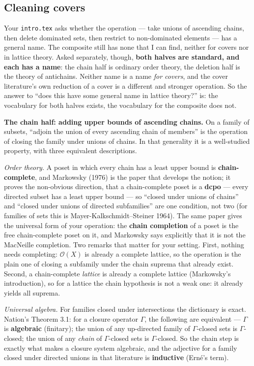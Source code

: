\documentclass[
]{article}
\newcounter{none} %
\begin{document}
\subsection{Cleaning covers}\label{cleaning-covers}

Your \texttt{intro.tex} asks whether the operation --- take unions of
ascending chains, then delete dominated sets, then restrict to
non-dominated elements --- has a general name. The composite still has
none that I can find, neither for covers nor in lattice theory. Asked
separately, though, \textbf{both halves are standard, and each has a
name}: the chain half is ordinary order theory, the deletion half is the
theory of antichains. Neither name is a name \emph{for covers}, and the
cover literature's own reduction of a cover is a different and stronger
operation. So the answer to ``does this have some general name in
lattice theory?'' is: the vocabulary for both halves exists, the
vocabulary for the composite does not.

\textbf{The chain half: adding upper bounds of ascending chains.} On a
family of subsets, ``adjoin the union of every ascending chain of
members'' is the operation of closing the family under unions of chains.
In that generality it is a well-studied property, with three equivalent
descriptions.

\emph{Order theory.} A poset in which every chain has a least upper
bound is \textbf{chain-complete}, and Markowsky (1976) is the paper that
develops the notion; it proves the non-obvious direction, that a
chain-complete poset is a \textbf{dcpo} --- every directed subset has a
least upper bound --- so ``closed under unions of chains'' and ``closed
under unions of directed subfamilies'' are one condition, not two (for
families of sets this is Mayer-Kalkschmidt--Steiner 1964). The same
paper gives the universal form of your operation: the \textbf{chain
completion} of a poset is the free chain-complete poset on it, and
Markowsky says explicitly that it is not the MacNeille completion. Two
remarks that matter for your setting. First, nothing needs completing:
\(\mathcal O(X)\) is already a complete lattice, so the operation is the
plain one of closing a subfamily under the chain suprema that already
exist. Second, a chain-complete \emph{lattice} is already a complete
lattice (Markowsky's introduction), so for a lattice the chain
hypothesis is not a weak one: it already yields all suprema.

\emph{Universal algebra.} For families closed under intersections the
dictionary is exact. Nation's Theorem 3.1: for a closure operator
\(\Gamma\), the following are equivalent --- \(\Gamma\) is
\textbf{algebraic} (finitary); the union of any up-directed family of
\(\Gamma\)-closed sets is \(\Gamma\)-closed; the union of any
\emph{chain} of \(\Gamma\)-closed sets is \(\Gamma\)-closed. So the
chain step is exactly what makes a closure system algebraic, and the
adjective for a family closed under directed unions in that literature
is \textbf{inductive} (Ern\'{e}'s term).
\end{document}

